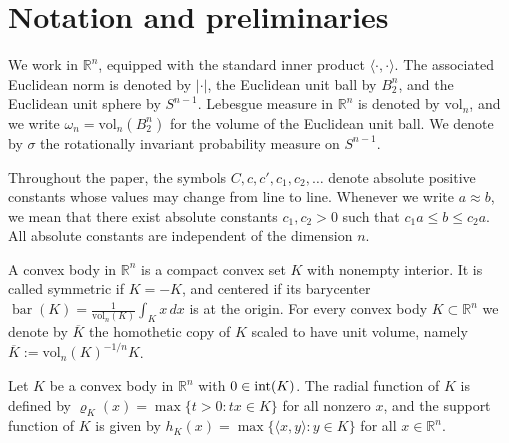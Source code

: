 \documentclass[11pt,leqno]{article}
\theoremstyle{remark}
\numberwithin{equation}{section}
\newcommand{\vol}{\mathrm{vol}}
\newcommand{\ls}{\leqslant}
\begin{document}
\section{Notation and preliminaries}\label{section:2}

We work in $\mathbb{R}^n$, equipped with the standard inner product $\langle \cdot, \cdot \rangle$.  
The associated Euclidean norm is denoted by $|\cdot|$, the Euclidean unit ball by $B_2^n$, and the Euclidean unit sphere by $S^{n-1}$.  
Lebesgue measure in $\mathbb{R}^n$ is denoted by $\vol_n$, and we write $\omega_n = \vol_n(B_2^n)$ for the volume of the Euclidean unit ball.
We denote by $\sigma$ the rotationally invariant probability measure on $S^{n-1}$.

Throughout the paper, the symbols $C, c, c', c_1, c_2, \ldots$ denote absolute positive constants whose values may change from line to line.  
Whenever we write $a \approx b$, we mean that there exist absolute constants $c_1, c_2 > 0$ such that $c_1 a \ls b \ls c_2 a$. 
All absolute constants are independent of the dimension $n$.

\smallskip 

A convex body in $\mathbb{R}^n$ is a compact convex set $K$ with nonempty interior.  
It is called symmetric if $K = -K$, and centered if its barycenter $\operatorname{bar}(K) = \frac{1}{\vol_n(K)} \int_K x\,dx$ is at the origin. 
For every convex body $K\subset \mathbb R^n$ we denote by $\overline{K}$ the homothetic copy of $K$ scaled to have unit volume,
namely $\overline{K}:=\vol_n(K)^{-1/n}K$.

Let $K$ be a convex body in $\mathbb{R}^n$ with $0\in {\rm int}(K)$. 
The radial function of $K$ is defined by $\varrho_K(x) = \max\{ t > 0 : t x \in K \}$ for all nonzero $x$, and the support function of $K$ is given by 
$h_K(x)=\max\{\langle x,y\rangle :y\in K \}$ for all $x\in\mathbb{R}^n$. 
\end{document}
